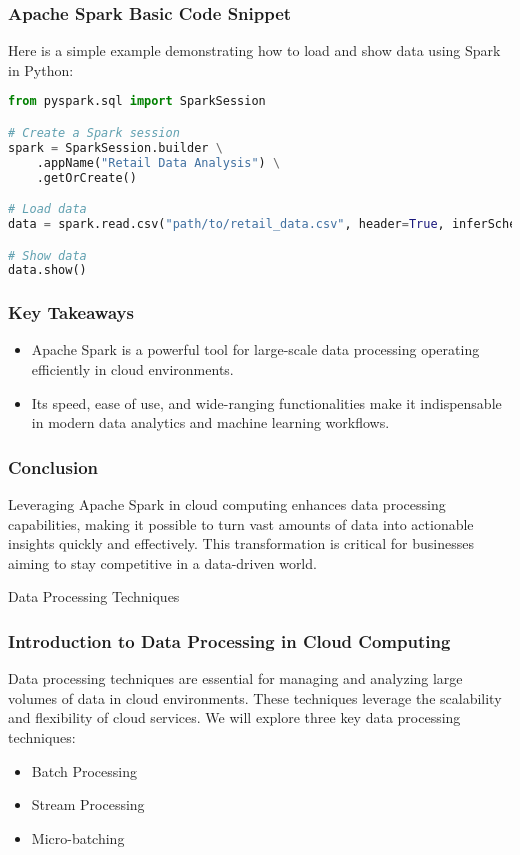 \documentclass[aspectratio=169]{beamer}
\begin{document}
\begin{frame}[fragile]
    \frametitle{Apache Spark Basic Code Snippet}
    Here is a simple example demonstrating how to load and show data using Spark in Python:
    
    \begin{lstlisting}[language=Python]
from pyspark.sql import SparkSession

# Create a Spark session
spark = SparkSession.builder \
    .appName("Retail Data Analysis") \
    .getOrCreate()

# Load data
data = spark.read.csv("path/to/retail_data.csv", header=True, inferSchema=True)

# Show data
data.show()
    \end{lstlisting}
\end{frame}

\begin{frame}[fragile]
    \frametitle{Key Takeaways}
    \begin{itemize}
        \item Apache Spark is a powerful tool for large-scale data processing operating efficiently in cloud environments.
        \item Its speed, ease of use, and wide-ranging functionalities make it indispensable in modern data analytics and machine learning workflows.
    \end{itemize}
\end{frame}

\begin{frame}[fragile]
    \frametitle{Conclusion}
    Leveraging Apache Spark in cloud computing enhances data processing capabilities, making it possible to turn vast amounts of data into actionable insights quickly and effectively. This transformation is critical for businesses aiming to stay competitive in a data-driven world.
\end{frame}

\begin{frame}{Data Processing Techniques}
    \frametitle{Introduction to Data Processing in Cloud Computing}
    Data processing techniques are essential for managing and analyzing large volumes of data in cloud environments. These techniques leverage the scalability and flexibility of cloud services. We will explore three key data processing techniques:
    \begin{itemize}
        \item Batch Processing
        \item Stream Processing
        \item Micro-batching
    \end{itemize}
\end{frame}
\end{document}
